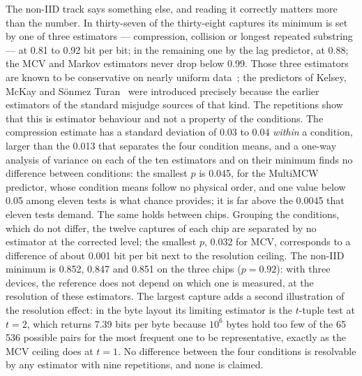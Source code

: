The non-IID track says something else, and reading it correctly matters
more than the number. In thirty-seven of the thirty-eight captures its
minimum is set by one of three estimators --- compression, collision or
longest repeated substring --- at 0.81 to 0.92 bit per bit; in the
remaining one by the lag predictor, at 0.88; the MCV and Markov
estimators never drop below 0.99. Those three estimators are known to be
conservative on nearly uniform data~\cite{zhu_2017_analysis}; the
predictors of Kelsey, McKay and S\"onmez Turan~\cite{kelsey_2015_predictive}
were introduced precisely because the earlier estimators of the standard
misjudge sources of that kind. The repetitions show that this is
estimator behaviour and not a property of the conditions. The compression
estimate has a standard deviation of 0.03 to 0.04 \emph{within} a
condition, larger than the 0.013 that separates the four condition means,
and a one-way analysis of variance on each of the ten estimators and on
their minimum finds
no difference between conditions: the smallest $p$ is 0.045, for the
MultiMCW predictor, whose condition means follow no physical order, and
one value below 0.05 among eleven tests is what chance provides; it is
far above the 0.0045 that eleven tests demand. The same holds between
chips. Grouping the conditions, which do not differ, the twelve captures
of each chip are separated by no estimator at the corrected level; the
smallest $p$, 0.032 for MCV, corresponds to a difference of about
0.001 bit per bit next to the resolution ceiling. The non-IID minimum is
0.852, 0.847 and 0.851 on the three chips ($p = 0.92$): with three devices,
the reference does not depend on which one is measured, at the resolution
of these estimators. The largest capture adds a
second illustration of the resolution effect: in the byte layout its
limiting estimator is the $t$-tuple test at $t = 2$, which returns 7.39
bits per byte because $10^6$ bytes hold too few of the 65\,536 possible
pairs for the most frequent one to be representative, exactly as the MCV
ceiling does at $t = 1$. No difference between the four conditions is
resolvable by any estimator with nine repetitions, and none
is claimed.


